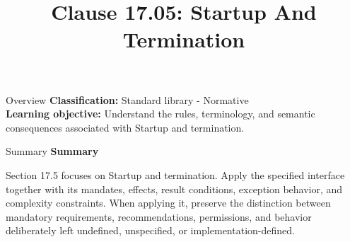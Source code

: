 \documentclass[10pt,letterpaper]{article}
\title{Clause 17.05: Startup And Termination}
\author{}
\date{}
\begin{document}
\maketitle
\begin{CornellOverviewBox}{Overview}
\textbf{Classification:} Standard library - Normative\\[2pt]
\textbf{Learning objective:} Understand the rules, terminology, and semantic consequences associated with Startup and termination.
\end{CornellOverviewBox}\begin{CornellSummaryBox}{Summary}
{\sffamily\bfseries\color{Accent} Summary}\par\vspace{3pt}Section 17.5 focuses on Startup and termination. Apply the specified interface together with its mandates, effects, result conditions, exception behavior, and complexity constraints. When applying it, preserve the distinction between mandatory requirements, recommendations, permissions, and behavior deliberately left undefined, unspecified, or implementation-defined.
\end{CornellSummaryBox}
\end{document}

